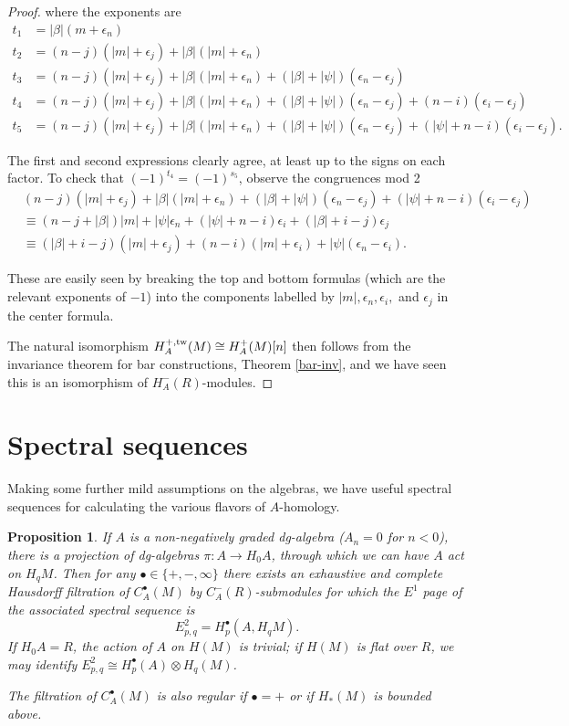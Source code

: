 \documentclass{memo-l}
\newtheorem{proposition}[theorem]{Proposition}
\theoremstyle{definition}
\theoremstyle{remark}
\numberwithin{section}{chapter}
\numberwithin{equation}{chapter}
\begin{document}
\begin{proof}
where the exponents are 
\begin{align*}
t_1 &= |\beta|(m+\epsilon_n)\\
t_2 &= (n-j)(|m|+\epsilon_j)+|\beta|(|m|+\epsilon_n)\\
t_3 &= (n-j)(|m|+\epsilon_j)+|\beta|(|m|+\epsilon_n) + (|\beta|+|\psi|)(\epsilon_n - \epsilon_j) \\
t_4 &= (n-j)(|m|+\epsilon_j)+|\beta|(|m|+\epsilon_n) + (|\beta|+|\psi|)(\epsilon_n - \epsilon_j)+ (n-i)(\epsilon_i -\epsilon_j)\\
t_5 &= (n-j)(|m|+\epsilon_j)+|\beta|(|m|+\epsilon_n) + (|\beta|+|\psi|)(\epsilon_n - \epsilon_j)+ (|\psi| + n-i)(\epsilon_i -\epsilon_j).
\end{align*}

\noindent The first and second expressions clearly agree, at least up to the signs on each factor. To check that $(-1)^{t_4} = (-1)^{s_5}$, observe the congruences mod 2
\begin{align*}&(n-j)(|m|+\epsilon_j) + |\beta|(|m|+\epsilon_n) + (|\beta| + |\psi|)(\epsilon_n - \epsilon_j) + (|\psi|+n-i)(\epsilon_i - \epsilon_j)\\
&\equiv (n-j+|\beta|)|m| + |\psi| \epsilon_n + (|\psi| + n-i) \epsilon_i + (|\beta|+i-j) \epsilon_j \\
&\equiv (|\beta| + i -j)(|m| + \epsilon_j) + (n-i)(|m|+\epsilon_i) + |\psi|(\epsilon_n - \epsilon_i).
\end{align*}

\noindent These are easily seen by breaking the top and bottom formulas (which are the relevant exponents of $-1$) into the components labelled by $|m|, \epsilon_n, \epsilon_i,$ and $\epsilon_j$ in the center formula.

The natural isomorphism $H^{+, \textup{tw}}_A(M) \cong H^+_A(M)[n]$ then follows from the invariance theorem for bar constructions, Theorem \ref{bar-inv}, and we have seen this is an isomorphism of $H^-_A(R)$-modules.
\end{proof}

\section{Spectral sequences}
Making some further mild assumptions on the algebras, we have useful spectral sequences for calculating the various flavors of $A$-homology.

\begin{proposition}If $A$ is a non-negatively graded dg-algebra ($A_n = 0$ for $n < 0$), there is a projection of dg-algebras $\pi: A \to H_0 A$, through which we can have $A$ act on $H_qM$. Then for any $\bullet \in \{+, -,\infty\}$ there exists an exhaustive and complete Hausdorff filtration of $C^\bullet_A(M)$ by $C^-_A(R)$-submodules for which the $E^1$ page of the associated spectral sequence is $$E^2_{p,q} = H_p^\bullet(A, H_q M).$$ 
If $H_0 A = R$, the action of $A$ on $H(M)$ is trivial; if $H(M)$ is flat over $R$, we may identify $E^2_{p,q} \cong H^\bullet_p(A) \otimes H_q(M)$.

The filtration of $C^\bullet_A(M)$ is also regular if $\bullet = +$ or if $H_*(M)$ is bounded above. 
\end{proposition}
\end{document}
